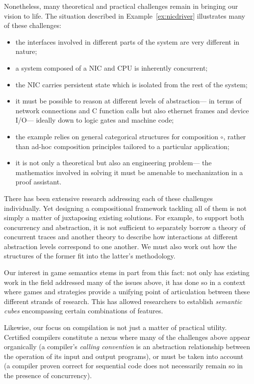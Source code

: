 Nonetheless,
many theoretical and practical challenges remain
in bringing our vision to life.
The situation described in Example~\ref{ex:nicdriver}
illustrates many of these challenges:
\begin{itemize} \itemsep 0pt
  \item the interfaces involved in different parts of the system
    are very different in nature;
  \item a system composed of a NIC and CPU
    is inherently concurrent;
  \item the NIC carries persistent state
    which is isolated from the rest of the system;
  \item it must be possible to reason at different levels of abstraction---%
    in terms of network connections and C function calls
    but also ethernet frames and device I/O---%
    ideally down to logic gates and machine code;
  \item the example relies on general categorical structures for composition $\circ$,
    rather than ad-hoc composition principles tailored to a particular application;
  \item it is not only a theoretical but also an engineering problem---%
    the mathematics involved in solving it must be
    amenable to mechanization in a proof assistant.
\end{itemize}
There has been
extensive research
addressing each of these challenges individually.
Yet designing a compositional framework tackling all of them
is not simply a matter of juxtaposing existing solutions.
For example,
to support both concurrency and abstraction,
it is not sufficient to separately borrow
a theory of concurrent traces and
another theory to describe
how interactions at different abstraction levels
correspond to one another.
We must also work out how the structures
of the former
fit into the latter's methodology.

Our interest in game semantics
stems in part from this fact:
not only has existing work in the field
addressed many of the issues above,
it has done so in a context where games and strategies
provide a unifying point of articulation
between these different strands of research.
This has allowed researchers
to establish \emph{semantic cubes}
encompassing certain combinations of features.

Likewise,
our focus on compilation
is not just a matter of practical utility.
Certified compilers constitute a nexus where
many of the challenges above appear organically
(a compiler's \emph{calling convention} is an abstraction relationship
between the operation of its input and output programs),
or must be taken into account
(a compiler proven correct for sequential code
does not necessarily remain so in the presence of concurrency).

